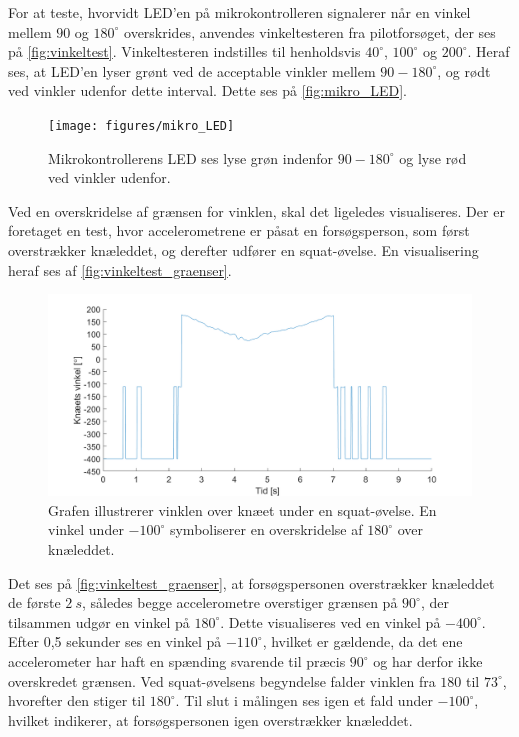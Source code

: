 For at teste, hvorvidt LED'en på mikrokontrolleren signalerer når en vinkel mellem $90$ og $180^{\circ}$ overskrides, anvendes vinkeltesteren fra pilotforsøget, der ses på \autoref{fig:vinkeltest}. Vinkeltesteren indstilles til henholdsvis $40^{\circ}$, $100^{\circ}$ og $200^{\circ}$. 
Heraf ses, at LED'en lyser grønt ved de acceptable vinkler mellem $90-180^{\circ}$, og rødt ved vinkler udenfor dette interval. Dette ses på \autoref{fig:mikro_LED}.

\begin{figure}[H]
\centering
\texttt{[image: figures/mikro\_LED]}
\caption{Mikrokontrollerens LED ses lyse grøn indenfor $90-180^{\circ}$ og lyse rød ved vinkler udenfor.}
\label{fig:mikro_LED}
\end{figure}

\noindent
Ved en overskridelse af grænsen for vinklen, skal det ligeledes visualiseres. 
Der er foretaget en test, hvor accelerometrene er påsat en forsøgsperson, som først overstrækker knæleddet, og derefter udfører en squat-øvelse. 
En visualisering heraf ses af \autoref{fig:vinkeltest_graenser}.

\begin{figure}[H]
\centering
\includegraphics[width=1\textwidth]{figures/vinkeltest_graenser}
\caption{Grafen illustrerer vinklen over knæet under en squat-øvelse. En vinkel under $-100^{\circ}$ symboliserer en overskridelse af $180^{\circ}$ over knæleddet.}
\label{fig:vinkeltest_graenser}
\end{figure}

\noindent
Det ses på \autoref{fig:vinkeltest_graenser}, at forsøgspersonen overstrækker knæleddet de første $2~s$, således begge accelerometre overstiger grænsen på $90^{\circ}$, der tilsammen udgør en vinkel på $180^{\circ}$. 
Dette visualiseres ved en vinkel på $-400^{\circ}$. 
Efter 0,5 sekunder ses en vinkel på $-110^{\circ}$, hvilket er gældende, da det ene accelerometer har haft en spænding svarende til præcis $90^{\circ}$ og har derfor ikke overskredet grænsen. 
Ved squat-øvelsens begyndelse falder vinklen fra $180$ til $73^{\circ}$, hvorefter den stiger til $180^{\circ}$. 
Til slut i målingen ses igen et fald under $-100^{\circ}$, hvilket indikerer, at forsøgspersonen igen overstrækker knæleddet.

